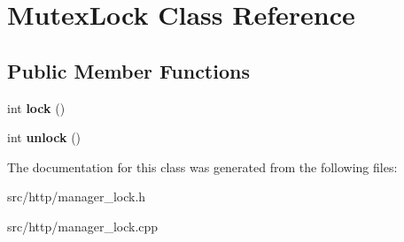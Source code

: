 \hypertarget{classMutexLock}{}\section{Mutex\+Lock Class Reference}
\label{classMutexLock}
\subsection*{Public Member Functions}
\begin{DoxyCompactItemize}
\item 
\mbox{\label{classMutexLock_ac2b61ce467a009859472ca688e78a3b1}} 
int {\bfseries lock} ()
\item 
\mbox{\label{classMutexLock_acfcff8cc8d51ad233d341844e4feb4a6}} 
int {\bfseries unlock} ()
\end{DoxyCompactItemize}


The documentation for this class was generated from the following files\+:\begin{DoxyCompactItemize}
\item 
src/http/manager\+\_\+lock.\+h\item 
src/http/manager\+\_\+lock.\+cpp\end{DoxyCompactItemize}
